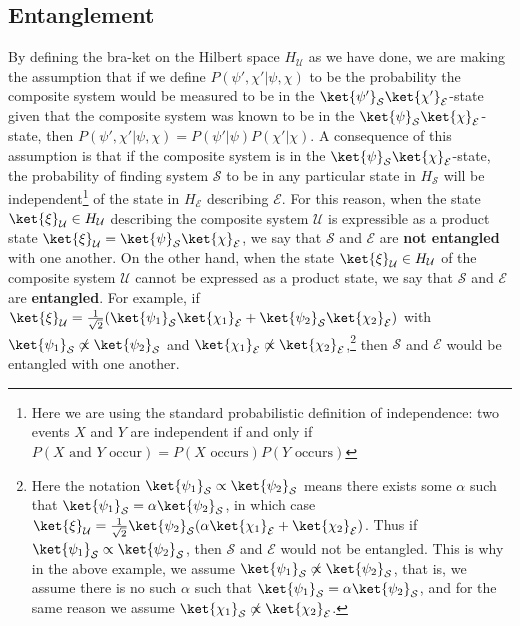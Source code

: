     \subsection{Entanglement}  
     By defining the bra-ket on the Hilbert space $H_\mathcal{U}$ as we have done, we are making the assumption that if we define $P(\psi',\chi'|\psi,\chi)$ to be the probability the composite system would be measured to be in the $\ket{\psi'}_\mathcal{S}\ket{\chi'}_\mathcal{E}$-state given that the composite system was known to be in the $\ket{\psi}_\mathcal{S}\ket{\chi}_\mathcal{E}$-state, then $P(\psi',\chi'|\psi,\chi)=P(\psi'|\psi)P(\chi'|\chi).$ A consequence of this assumption is that if the composite system is in the $\ket{\psi}_\mathcal{S}\ket{\chi}_\mathcal{E}$-state, the probability of finding system $\mathcal{S}$ to be in any particular state in $H_\mathcal{S}$ will be independent\footnote{Here we are using the standard probabilistic definition of independence: two events $X$ and $Y$ are independent if and only if $P(X \text{ and } Y\text{ occur})=P(X\text{ occurs})P(Y\text{ occurs})$} of the state in $H_\mathcal{E}$ describing $\mathcal{E}$. For this reason, when the state $\ket{\xi}_\mathcal{U}\in H_\mathcal{U}$ describing the composite system $\mathcal{U}$ is expressible as a product state $\ket{\xi}_\mathcal{U}=\ket{\psi}_\mathcal{S}\ket{\chi}_\mathcal{E}$,  we say that $\mathcal{S}$ and $\mathcal{E}$ are \textbf{not entangled} with one another. On the other hand, when  the state $\ket{\xi}_\mathcal{U}\in H_\mathcal{U}$ of the composite system $\mathcal{U}$ cannot be expressed as a product state, we say that $\mathcal{S}$ and $\mathcal{E}$ are \textbf{entangled}.
       For example, if $\ket{\xi}_\mathcal{U}=\frac{1}{\sqrt{2}}(\ket{\psi_1}_\mathcal{S}\ket{\chi_1}_\mathcal{E}+\ket{\psi_2}_\mathcal{S}\ket{\chi_2}_\mathcal{E})$ with $\ket{\psi_1}_\mathcal{S}\not\propto\ket{\psi_2}_\mathcal{S}$ and $\ket{\chi_1}_\mathcal{E}\not\propto\ket{\chi_2}_\mathcal{E}$,\footnote{Here the notation $\ket{\psi_1}_\mathcal{S}\propto\ket{\psi_2}_\mathcal{S}$ means there exists some $\alpha$ such that $\ket{\psi_1}_\mathcal{S}=\alpha\ket{\psi_2}_\mathcal{S}$, in which case $\ket{\xi}_\mathcal{U}=\frac{1}{\sqrt{2}}\ket{\psi_2}_\mathcal{S}(\alpha\ket{\chi_1}_\mathcal{E}+\ket{\chi_2}_\mathcal{E})$. Thus if  $\ket{\psi_1}_\mathcal{S}\propto\ket{\psi_2}_\mathcal{S}$, then  $\mathcal{S}$ and $\mathcal{E}$ would not be entangled. This is why in the above example, we assume $\ket{\psi_1}_\mathcal{S}\not\propto\ket{\psi_2}_\mathcal{S}$, that is, we assume there is no such $\alpha$ such that $\ket{\psi_1}_\mathcal{S}=\alpha\ket{\psi_2}_\mathcal{S}$, and for the same reason we assume $\ket{\chi_1}_\mathcal{S}\not\propto\ket{\chi_2}_\mathcal{E}$.} then $\mathcal{S}$ and $\mathcal{E}$ would be entangled with one another.
      

